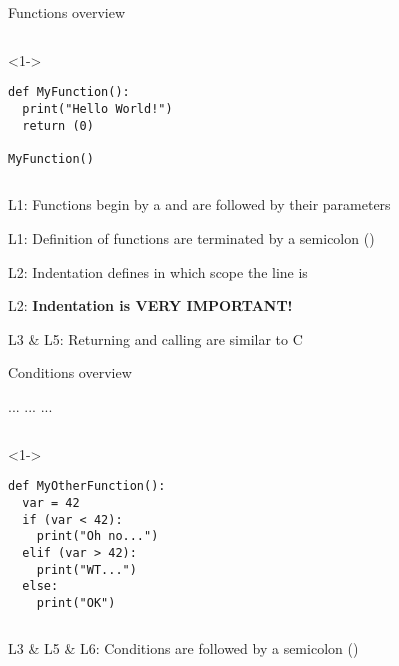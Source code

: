 
\begin{frame}[fragile]{Functions overview}


  \begin{columns}[onlytextwidth]
    \begin{column}{\textwidth}
      \begin{onlyenv}<1->
        \begin{lstlisting}[style=python]
def MyFunction():
  print("Hello World!")
  return (0)

MyFunction() \end{lstlisting}
      \end{onlyenv}
    \end{column}
  \end{columns}

   L1: Functions begin by a  and are followed by their parameters

   L1: Definition of functions are terminated by a semicolon (\TTBF{:})

   L2: Indentation defines in which scope the line is

   L2: \textbf{Indentation is VERY IMPORTANT!}

   L3 \& L5: Returning and calling are similar to C

\end{frame}



\begin{frame}[fragile]{Conditions overview}

   ...  ...  ...

  \begin{columns}[onlytextwidth]
    \begin{column}{\textwidth}
      \begin{onlyenv}<1->
        \begin{lstlisting}[style=python]
def MyOtherFunction():
  var = 42
  if (var < 42):
    print("Oh no...")
  elif (var > 42):
    print("WT...")
  else:
    print("OK") \end{lstlisting}
      \end{onlyenv}
    \end{column}
  \end{columns}

%
   L3 \& L5 \& L6: Conditions are followed by a semicolon (\TTBF{:})

\end{frame}


